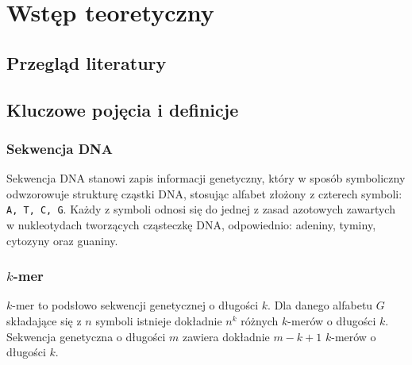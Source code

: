 \clearpage
\section{Wstęp teoretyczny}

    \subsection{Przegląd literatury}


    \subsection{Kluczowe pojęcia i definicje}

        \subsubsection{Sekwencja DNA}

            Sekwencja DNA stanowi zapis informacji genetyczny, który w sposób symboliczny odwzorowuje strukturę cząstki DNA, stosując alfabet złożony z czterech symboli: \texttt{A, T, C, G}. Każdy z symboli odnosi się do jednej z zasad azotowych zawartych w nukleotydach tworzących cząsteczkę DNA, odpowiednio: adeniny, tyminy, cytozyny oraz guaniny.

        \subsubsection{$k$-mer}

            $k$-mer to podsłowo sekwencji genetycznej o długości $k$. Dla danego alfabetu $G$ składające się z $n$ symboli istnieje dokładnie $n^k$ różnych $k$-merów o długości $k$. Sekwencja genetyczna o długości $m$ zawiera dokładnie $m - k + 1$ $k$-merów o długości $k$.


